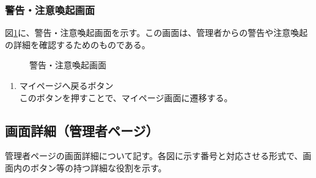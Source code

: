 \documentclass[a4j]{jarticle}
\begin{document}
\subsubsection{警告・注意喚起画面}
図\ref{fig:read_warning}に、警告・注意喚起画面を示す。この画面は、管理者からの警告や注意喚起の詳細を確認するためのものである。\\

\begin{figure}[H]
\centering
{}
\caption{警告・注意喚起画面}
\label{fig:read_warning}
\end{figure}
\begin{enumerate}
  \renewcommand{\labelenumi}{\textcircled{\scriptsize \theenumi}}

  \item マイページへ戻るボタン\\
  このボタンを押すことで、マイページ画面に遷移する。
\end{enumerate}

\subsection{画面詳細（管理者ページ）}
管理者ページの画面詳細について記す。各図に示す番号と対応させる形式で、画面内のボタン等の持つ詳細な役割を示す。
\end{document}

